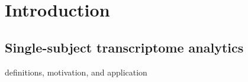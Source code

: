 \chapter{Introduction}\label{Chap:Intro}
\section{Single-subject transcriptome analytics}\label{sec:nof1}

\indent \indent definitions, motivation, and application

%
%
%
